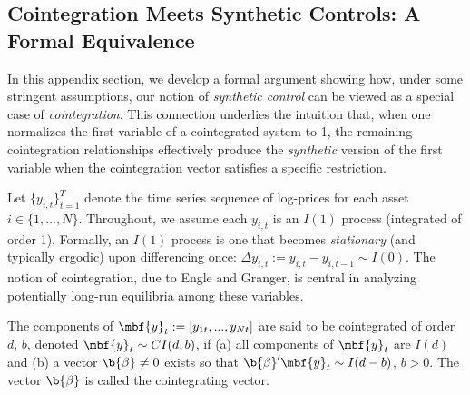 \subsection{Cointegration Meets Synthetic Controls: A Formal Equivalence}
\label{sec:cointegration_meets_synthetic_controls}

In this appendix section, we develop a formal argument showing how, under some stringent assumptions, our notion of \emph{synthetic control} can be viewed as a special case of \emph{cointegration}. This connection underlies the intuition that, when one normalizes the first variable of a cointegrated system to 1, the remaining cointegration relationships effectively produce the \emph{synthetic} version of the first variable when the cointegration vector satisfies a specific restriction. 


Let $\{y_{i,t} \}_{t=1}^{T}$ denote the time series sequence of log-prices for each asset $i\in\{1,\ldots,N\}$.
%
Throughout, we assume each $y_{i,t}$ is an $I(1)$ process (integrated of order 1). 
%
Formally, an $I(1)$ process is one that becomes \emph{stationary} (and typically ergodic) upon differencing once:
$\Delta y_{i,t} := y_{i,t} - y_{i,t-1} \sim I(0).$
%
The notion of cointegration, due to Engle and Granger, is central in analyzing potentially long-run equilibria among these variables.

\begin{definition}
The components of $\mbf{y}_t:=[y_{1t}, ..., y_{Nt}]$ are said to be cointegrated of order $d$, $b$, denoted $\mbf{y}_t \sim CI(d,b)$, if (a) all components of $\mbf{y}_t$ are $I(d)$ and (b) a vector $\b{\beta}\neq 0$ exists so that $\b{\beta}'\mbf{y}_t \sim I(d-b)$, $b > 0$. The vector $\b{\beta}$ is called the cointegrating vector.
\end{definition}

